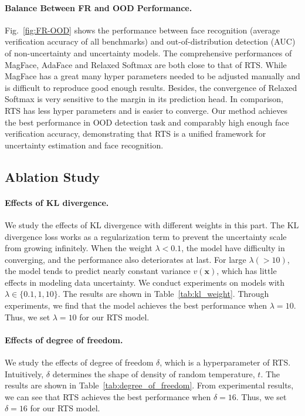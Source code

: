 \documentclass[letterpaper]{article} %
\begin{document}
\paragraph{Balance Between FR and OOD Performance. } Fig.~\ref{fig:FR-OOD} shows the performance between face recognition (average verification accuracy of all benchmarks) and out-of-distribution detection (AUC) of non-uncertainty and uncertainty models. The comprehensive performances of MagFace, AdaFace and Relaxed Softmax are both close to that of RTS. While MagFace has a great many hyper parameters needed to be adjusted manually and is difficult to reproduce good enough results. Besides, the convergence of Relaxed Softmax is very sensitive to the margin in its prediction head. In comparison, RTS has less hyper parameters and is easier to converge. Our method achieves the best performance in OOD detection task and comparably high enough face verification accuracy, demonstrating that RTS is a unified framework for uncertainty estimation and face recognition.










\subsection{Ablation Study}
\label{ssec:ablation}

\paragraph{Effects of KL divergence.} We study the effects of KL divergence with different weights in this part.
%
The KL divergence loss works as a regularization term to prevent the uncertainty scale from growing infinitely. When the weight $\lambda < 0.1$, the model have difficulty in converging, and the performance also deteriorates at last.
%
For large $\lambda (>10)$, the model tends to predict nearly constant variance $v(\bm{x})$, which has little effects in modeling data uncertainty.
%
We conduct experiments on models with $\lambda \in \{0.1, 1, 10\}$. The results are shown in Table~\ref{tab:kl_weight}.
%
Through experiments, we find that the model achieves the best performance when $\lambda = 10$. Thus, we set $\lambda = 10$ for our RTS model.

\paragraph{Effects of degree of freedom.} We study the effects of degree of freedom $\delta$, which is a hyperparameter of RTS. Intuitively, $\delta$ determines the shape of density of random temperature, $t$. The results are shown in Table~\ref{tab:degree_of_freedom}. From experimental results, we can see that RTS achieves the best performance when $\delta = 16$. Thus, we set $\delta = 16$ for our RTS model.
\end{document}
